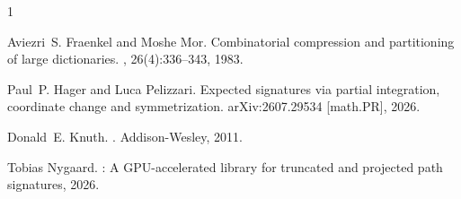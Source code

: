 \documentclass{amsart}
\theoremstyle{definition}
\theoremstyle{remark}
\begin{document}
\begin{thebibliography}{1}

Aviezri~S. Fraenkel and Moshe Mor.
\newblock Combinatorial compression and partitioning of large dictionaries.
, 26(4):336--343, 1983.

Paul~P. Hager and Luca Pelizzari.
\newblock Expected signatures via partial integration, coordinate change and
  symmetrization.
\newblock arXiv:2607.29534 [math.PR], 2026.

Donald~E. Knuth.
.
\newblock Addison-Wesley, 2011.

Tobias Nygaard.
: A {GPU}-accelerated library for truncated and projected
  path signatures, 2026.

\end{thebibliography}
\end{document}
